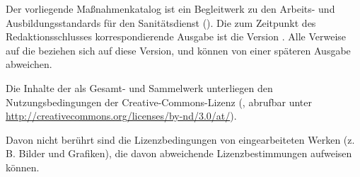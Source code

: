 \documentclass[
ngerman,
paper=a4,
asymmetric,
fontsize=9pt,
draft=false,
openany,
numbers=noenddot,
bibtotocnumbered,
footnotes=multiple,
toc=flat,
]{scrbook}
\begin{document}



\restoregeometry


Der vorliegende Maßnahmenkatalog ist ein Begleitwerk zu den
Arbeits- und Ausbildungsstandards für den Sanitätsdienst
(\AASS). Die zum Zeitpunkt des Redaktionsschlusses
korrespondierende Ausgabe ist die Version \VarAassVersion.
Alle Verweise auf die {\AASS} 
beziehen sich auf diese Version, und können von einer
späteren Ausgabe abweichen.


Die Inhalte der {\AASS} als Gesamt- und Sammelwerk unterliegen 
den Nutzungsbedingungen der Creative-Commons-Lizenz  (, 
abrufbar
unter
\url{http://creativecommons.org/licenses/by-nd/3.0/at/}).

Davon nicht berührt sind die Lizenzbedingungen von eingearbeiteten Werken
(z.\,B. Bilder und Grafiken), die davon abweichende
Lizenzbestimmungen aufweisen können.
\end{document}
